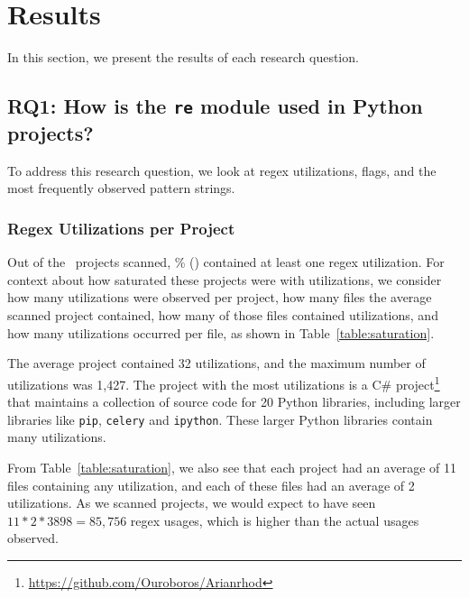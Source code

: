 \section{Results}
\label{sec:results}

In this section, we present the results of each research question.

\subsection{RQ1: How  is the {\tt re} module used in Python projects?}
To address this research question, we look at regex utilizations, flags, and the most frequently observed pattern strings.

\subsubsection{Regex Utilizations per Project}
Out of the \ projects scanned, \% () contained at least one regex utilization.  For context about how saturated these projects were with utilizations, we consider how many utilizations were observed per project, how many files the average scanned project  contained, how many of those files contained utilizations, and how many utilizations occurred per file, as shown in Table~\ref{table:saturation}.

The average project contained 32 utilizations, and the maximum number of utilizations was 1,427.  The project with the most utilizations is a C\# project\footnote{\url{https://github.com/Ouroboros/Arianrhod}} that maintains a collection of source code for 20 Python libraries, including larger libraries like {\tt pip}, {\tt celery} and {\tt ipython}.  These larger Python libraries contain many utilizations.



From Table~\ref{table:saturation}, we also see that each project had an average of 11 files containing any utilization, and each of these files had an average of 2 utilizations.  As we scanned  projects, we would expect to have seen $11*2*3898=85,756$ regex usages, which is higher than the actual  usages observed. 

